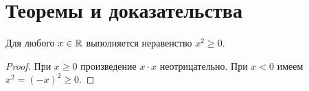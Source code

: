 \section{Теоремы и доказательства}
\begin{theorem}
Для любого $x\in\mathbb{R}$ выполняется неравенство $x^2\geq0$.
\end{theorem}
\begin{proof}
При $x\geq0$ произведение $x\cdot x$ неотрицательно.
При $x<0$ имеем $x^2=(-x)^2\geq0$.
\end{proof}
